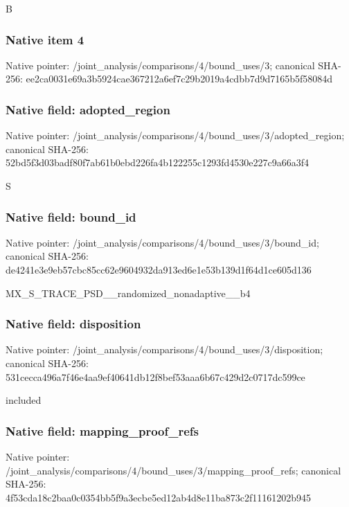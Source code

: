 \documentclass[10pt,a4paper]{article}
\begin{document}
\begingroup\raggedright\sloppy B\par\endgroup

\subsubsection{Native item 4}
Native pointer: /joint\_\allowbreak{}analysis/comparisons/4/bound\_\allowbreak{}uses/3; canonical SHA-256: ee2ca0031e69a3b5924cae367212a6ef7c29b2019a4cdbb7d9d7165b5f58084d

\subsubsection{Native field: adopted\_\allowbreak{}region}
Native pointer: /joint\_\allowbreak{}analysis/comparisons/4/bound\_\allowbreak{}uses/3/adopted\_\allowbreak{}region; canonical SHA-256: 52bd5f3d03badf80f7ab61b0ebd226fa4b122255c1293fd4530e227c9a66a3f4

\begingroup\raggedright\sloppy S\par\endgroup

\subsubsection{Native field: bound\_\allowbreak{}id}
Native pointer: /joint\_\allowbreak{}analysis/comparisons/4/bound\_\allowbreak{}uses/3/bound\_\allowbreak{}id; canonical SHA-256: de4241e3e9eb57cbc85cc62e9604932da913ed6e1e53b139d1f64d1ce605d136

\begingroup\raggedright\sloppy MX\_\allowbreak{}S\_\allowbreak{}TRACE\_\allowbreak{}PSD\_\allowbreak{}\_\allowbreak{}randomized\_\allowbreak{}nonadaptive\_\allowbreak{}\_\allowbreak{}b4\par\endgroup

\subsubsection{Native field: disposition}
Native pointer: /joint\_\allowbreak{}analysis/comparisons/4/bound\_\allowbreak{}uses/3/disposition; canonical SHA-256: 531cecca496a7f46e4aa9ef40641db12f8bef53aaa6b67c429d2c0717dc599ce

\begingroup\raggedright\sloppy included\par\endgroup

\subsubsection{Native field: mapping\_\allowbreak{}proof\_\allowbreak{}refs}
Native pointer: /joint\_\allowbreak{}analysis/comparisons/4/bound\_\allowbreak{}uses/3/mapping\_\allowbreak{}proof\_\allowbreak{}refs; canonical SHA-256: 4f53cda18c2baa0c0354bb5f9a3ecbe5ed12ab4d8e11ba873c2f11161202b945
\end{document}
